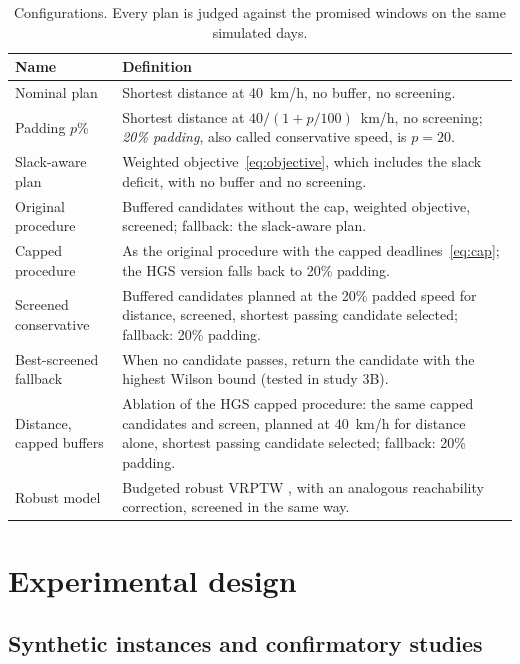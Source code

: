 \documentclass[11pt,a4paper]{article}
\theoremstyle{remark}
\begin{document}
\begin{table}[t]
\centering
\small
\caption{Configurations. Every plan is judged against the promised windows on the same simulated days.}
\label{tab:configs}
\begin{tabular}{@{}>{\raggedright\arraybackslash}p{3.2cm}>{\raggedright\arraybackslash}p{11.8cm}@{}}
\toprule
Name & Definition\\
\midrule
Nominal plan & Shortest distance at 40~km/h, no buffer, no screening.\\
Padding $p$\% & Shortest distance at $40/(1+p/100)$~km/h, no screening; \emph{20\% padding}, also called conservative speed, is $p=20$.\\
Slack-aware plan & Weighted objective~\eqref{eq:objective}, which includes the slack deficit, with no buffer and no screening.\\
Original procedure & Buffered candidates without the cap, weighted objective, screened; fallback: the slack-aware plan.\\
Capped procedure & As the original procedure with the capped deadlines~\eqref{eq:cap}; the HGS version falls back to 20\% padding.\\
Screened conservative & Buffered candidates planned at the 20\% padded speed for distance, screened, shortest passing candidate selected; fallback: 20\% padding.\\
Best-screened fallback & When no candidate passes, return the candidate with the highest Wilson bound (tested in study 3B).\\
Distance, capped buffers & Ablation of the HGS capped procedure: the same capped candidates and screen, planned at 40~km/h for distance alone, shortest passing candidate selected; fallback: 20\% padding.\\
Robust model & Budgeted robust VRPTW \citep{agra2013,bertsimas2004}, with an analogous reachability correction, screened in the same way.\\
\bottomrule
\end{tabular}
\end{table}

\section{Experimental design}\label{sec:design}

\subsection{Synthetic instances and confirmatory studies}
\end{document}
